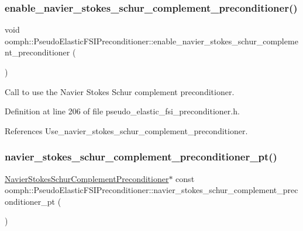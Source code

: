 \subsubsection{\texorpdfstring{enable\+\_\+navier\+\_\+stokes\+\_\+schur\+\_\+complement\+\_\+preconditioner()}{enable\_navier\_stokes\_schur\_complement\_preconditioner()}}
{\footnotesize\ttfamily void oomph\+::\+Pseudo\+Elastic\+F\+S\+I\+Preconditioner\+::enable\+\_\+navier\+\_\+stokes\+\_\+schur\+\_\+complement\+\_\+preconditioner (\begin{DoxyParamCaption}{ }\end{DoxyParamCaption})\hspace{0.3cm}{\ttfamily [inline]}}



Call to use the Navier Stokes Schur complement preconditioner. 



Definition at line 206 of file pseudo\+\_\+elastic\+\_\+fsi\+\_\+preconditioner.\+h.



References Use\+\_\+navier\+\_\+stokes\+\_\+schur\+\_\+complement\+\_\+preconditioner.

\mbox{\label{classoomph_1_1PseudoElasticFSIPreconditioner_a4e13b64643e9026f421fa1228333ca95}} 
\subsubsection{\texorpdfstring{navier\+\_\+stokes\+\_\+schur\+\_\+complement\+\_\+preconditioner\+\_\+pt()}{navier\_stokes\_schur\_complement\_preconditioner\_pt()}}
{\footnotesize\ttfamily \hyperlink{classoomph_1_1NavierStokesSchurComplementPreconditioner}{Navier\+Stokes\+Schur\+Complement\+Preconditioner}$\ast$ const oomph\+::\+Pseudo\+Elastic\+F\+S\+I\+Preconditioner\+::navier\+\_\+stokes\+\_\+schur\+\_\+complement\+\_\+preconditioner\+\_\+pt (\begin{DoxyParamCaption}{ }\end{DoxyParamCaption})\hspace{0.3cm}{\ttfamily [inline]}}



